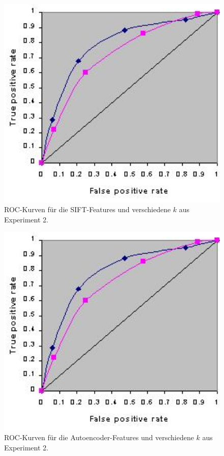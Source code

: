 \begin{figure}
	\centering
	\includegraphics[scale=0.4]{images/roc_ph.png}
	\caption{ROC-Kurven für die SIFT-Features und verschiedene $k$ aus Experiment 2.}
	\label{img:roc5}
\end{figure}

\begin{figure}
	\centering
    \includegraphics[scale=0.4]{images/roc_ph.png}
    \caption{ROC-Kurven für die Autoencoder-Features und verschiedene $k$ aus Experiment 2.}
    \label{img:roc6}
\end{figure}

